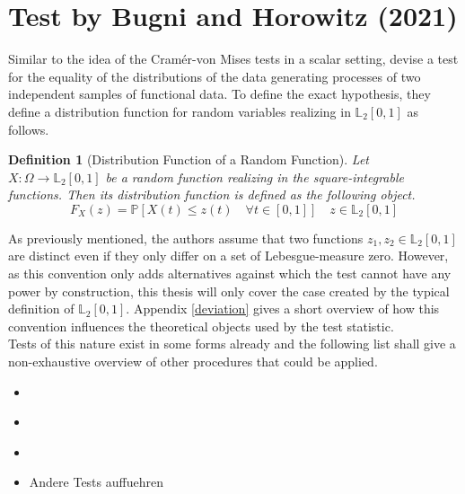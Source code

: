 \documentclass[12pt, a4paper]{article}
\theoremstyle{MAstyle} \newtheorem{assumption}{Assumption}[section]
\theoremstyle{MAstyle} \newtheorem{definition}{Definition}[section]
\theoremstyle{MAstyle} \newtheorem{theorem}{Theorem}[section]
\begin{document}
	\section{Test by Bugni and Horowitz (2021)}\label{Bugni_Horowitz_2021}
	
		Similar to the idea of the Cram\'{e}r-von Mises tests in a scalar setting, \cite{bugni_permutation_2021} devise a test for the equality of the distributions of the data generating processes of two independent samples of functional data. 
		To define the exact hypothesis, they define a distribution function for random variables realizing in $\mathbb{L}_2[0,1]$ as follows.
		\begin{definition}[Distribution Function of a Random Function]\label{dist_func}
			Let $X:\Omega \rightarrow \mathbb{L}_2[0,1]$ be a random function realizing in the square-integrable functions. Then its distribution function is defined as the following object.
			\begin{equation*}
				F_X(z) = \mathbb{P}\left[X(t) \leq z(t) \quad \forall t \in [0,1]\right] \quad z \in \mathbb{L}_2[0,1]
			\end{equation*}
		\end{definition}
		As previously mentioned, the authors assume that two functions $z_1, z_2 \in \mathbb{L}_2[0,1]$ are distinct even if they only differ on a set of Lebesgue-measure zero. However, as this convention only adds alternatives against which the test cannot have any power by construction, this thesis will only cover the case created by the typical definition of $\mathbb{L}_2[0,1]$. Appendix \ref{deviation} gives a short overview of how this convention influences the theoretical objects used by the test statistic.\\
		
		Tests of this nature exist in some forms already and the following list shall give a non-exhaustive overview of other procedures that could be applied.
		\begin{itemize}
			\item \cite{hall_permutation_2002}
			\item \cite{hall_two-sample_2007}
			\item \cite{pomann_two-sample_2016}
			\item {\color{red} Andere Tests auffuehren}
		\end{itemize}
		
\end{document}
